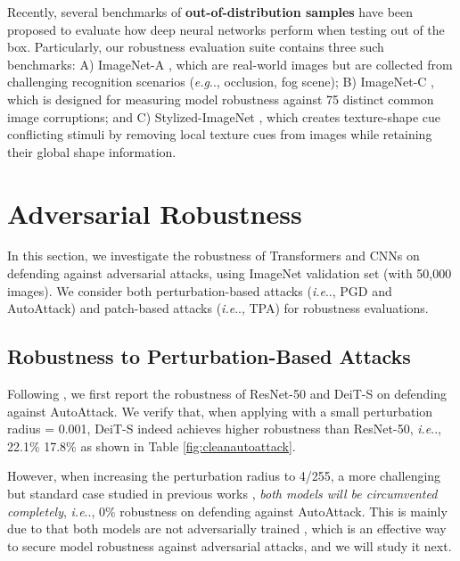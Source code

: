 \documentclass{article}
\makeatletter
\def\vs{{\bm{s}}}
\DeclareRobustCommand\onedot{\futurelet\@let@token\@onedot}
\def\@onedot{\ifx\@let@token.\else.\null\fi\xspace}
\def\eg{\emph{e.g}\onedot} \def\Eg{\emph{E.g}\onedot}
\def\ie{\emph{i.e}\onedot} \def\Ie{\emph{I.e}\onedot}
\makeatother
\begin{document}
Recently, several benchmarks of \textbf{out-of-distribution samples} have been proposed to  evaluate how deep neural networks perform when testing out of the box. Particularly, our robustness evaluation suite contains three such benchmarks: A) ImageNet-A \cite{hendrycks2021nae}, which are real-world images but are collected from challenging recognition scenarios (\eg, occlusion, fog scene); B) ImageNet-C \cite{Hendrycks2018}, which is designed for measuring model robustness against 75 distinct common image corruptions; and C) Stylized-ImageNet \cite{Geirhos2018}, which creates texture-shape cue conflicting stimuli by removing local texture cues from images while retaining their global shape information.



\section{Adversarial Robustness}
\label{sec:adv_robustness}
In this section, we investigate the robustness of Transformers and CNNs on defending against adversarial attacks, using ImageNet validation set (with 50,000 images). We consider both perturbation-based attacks (\ie, PGD and AutoAttack) and patch-based attacks (\ie, TPA) for robustness evaluations.

\subsection{Robustness to Perturbation-Based Attacks}
Following \cite{shao2021adversarial}, we first report the robustness of ResNet-50 and DeiT-S on defending against AutoAttack. We verify that, when applying with a small perturbation radius  = 0.001, DeiT-S indeed achieves higher robustness than ResNet-50, \ie, 22.1\% \vs 17.8\% as shown in Table \ref{fig:cleanautoattack}.

However, when increasing the perturbation radius to 4/255, a more challenging but standard case studied in previous works \cite{ali2019free_adv_train,wong2020fast,xie2020smooth}, \emph{both models will be circumvented completely}, \ie, 0\% robustness on defending against AutoAttack. This is mainly due to that both models are not adversarially trained \cite{Goodfellow2015,Madry2018}, which is an effective way to secure model robustness against adversarial attacks, and we will study it next.
\end{document}
